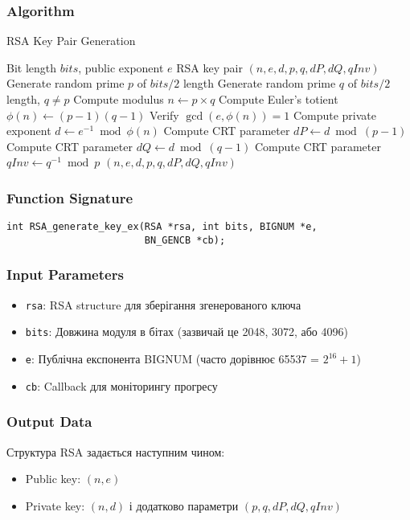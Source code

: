 \subsubsection{Algorithm}
\begin{algorithm}
    \caption{RSA Key Pair Generation}
    \begin{algorithmic}[1]
        \Require Bit length $bits$, public exponent $e$
        \Ensure RSA key pair $(n, e, d, p, q, dP, dQ, qInv)$
        \State Generate random prime $p$ of $bits/2$ length
        \State Generate random prime $q$ of $bits/2$ length, $q \neq p$
        \State Compute modulus $n \gets p \times q$
        \State Compute Euler's totient $\phi(n) \gets (p-1)(q-1)$
        \State Verify $\gcd(e, \phi(n)) = 1$
        \State Compute private exponent $d \gets e^{-1} \bmod \phi(n)$
        \State Compute CRT parameter $dP \gets d \bmod (p-1)$
        \State Compute CRT parameter $dQ \gets d \bmod (q-1)$
        \State Compute CRT parameter $qInv \gets q^{-1} \bmod p$
        \State \Return $(n, e, d, p, q, dP, dQ, qInv)$
    \end{algorithmic}
\end{algorithm}

\subsubsection{Function Signature}
\begin{verbatim}
int RSA_generate_key_ex(RSA *rsa, int bits, BIGNUM *e,
                        BN_GENCB *cb);
\end{verbatim}

\subsubsection{Input Parameters}
\begin{itemize}
    \item \texttt{rsa}: RSA structure для зберігання згенерованого ключа
    \item \texttt{bits}: Довжина модуля в бітах (зазвичай це 2048, 3072, або 4096)
    \item \texttt{e}: Публічна експонента BIGNUM (часто дорівнює 65537 = $2^{16}+1$)
    \item \texttt{cb}: Callback для моніторингу прогресу
\end{itemize}

\subsubsection{Output Data}
Структура RSA задається наступним чином:
\begin{itemize}
    \item Public key: $(n, e)$
    \item Private key: $(n, d)$ і додатково параметри $(p, q, dP, dQ, qInv)$
\end{itemize}

